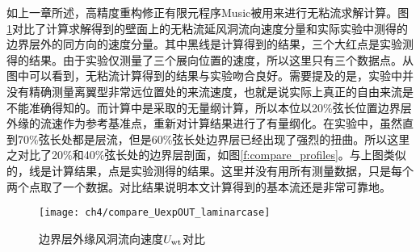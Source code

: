 如上一章所述，高精度重构修正有限元程序Music\cite{WangZJ2009,Zhu2016,Zh2017}被用来进行无粘流求解计算。图\ref{f:ConpareInvicidV}对比了计算求解得到的壁面上的无粘流延风洞流向速度分量和实际实验中测得的边界层外的同方向的速度分量。其中黑线是计算得到的结果，三个大红点是实验测得的结果。由于实验仅测量了三个展向位置的速度，所以这里只有三个数据点。从图中可以看到，无粘流计算得到的结果与实验吻合良好。需要提及的是，实验中并没有精确测量离翼型非常远位置处的来流速度，也就是说实际上真正的自由来流是不能准确得知的。而计算中是采取的无量纲计算，所以本位以20\%弦长位置边界层外缘的流速作为参考基准点，重新对计算结果进行了有量纲化。在实验中，虽然直到70\%弦长处都是层流，但是60\%弦长处边界层已经出现了强烈的扭曲。所以这里之对比了20\%和40\%弦长处的边界层剖面，如图\ref{f:compare_profiles}。与上图类似的，线是计算结果，点是实验测得的结果。这里并没有用所有测量数据，只是每个两个点取了一个数据。对比结果说明本文计算得到的基本流还是非常可靠地。
\begin{figure}
\centering
  \texttt{[image: ch4/compare\_UexpOUT\_laminarcase]}
\caption{边界层外缘风洞流向速度$U_{\rm{wt}}$对比}
\label{f:ConpareInvicidV}
\end{figure}

